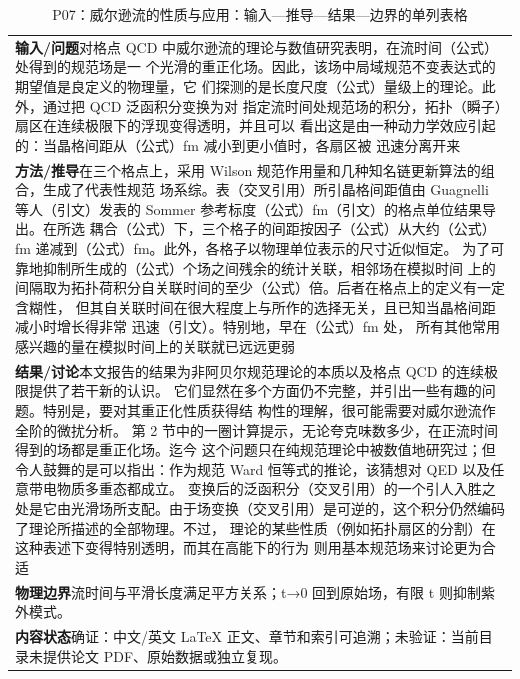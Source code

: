 \documentclass[UTF8,11pt,oneside]{ctexbook}
\begin{document}
\begin{table}[htbp]
  \centering
  \caption*{P07：威尔逊流的性质与应用：输入—推导—结果—边界的单列表格}
  \small
  \begin{tabular}{@{}p{}@{}}
    \toprule
    \textbf{输入/问题}\quad 对格点 QCD 中威尔逊流的理论与数值研究表明，在流时间（公式）处得到的规范场是一 个光滑的重正化场。因此，该场中局域规范不变表达式的期望值是良定义的物理量，它 们探测的是长度尺度（公式）量级上的理论。此外，通过把 QCD 泛函积分变换为对 指定流时间处规范场的积分，拓扑（瞬子）扇区在连续极限下的浮现变得透明，并且可以 看出这是由一种动力学效应引起的：当晶格间距从（公式）fm 减小到更小值时，各扇区被 迅速分离开来 \\
    \textbf{方法/推导}\quad 在三个格点上，采用 Wilson 规范作用量和几种知名链更新算法的组合，生成了代表性规范 场系综。表（交叉引用）所引晶格间距值由 Guagnelli 等人（引文）发表的 Sommer 参考标度（公式）fm（引文）的格点单位结果导出。在所选 耦合（公式）下，三个格子的间距按因子（公式）从大约（公式）fm 递减到（公式）fm。此外，各格子以物理单位表示的尺寸近似恒定。 为了可靠地抑制所生成的（公式）个场之间残余的统计关联，相邻场在模拟时间 上的间隔取为拓扑荷积分自关联时间的至少（公式）倍。后者在格点上的定义有一定含糊性， 但其自关联时间在很大程度上与所作的选择无关，且已知当晶格间距减小时增长得非常 迅速（引文）。特别地，早在（公式）fm 处， 所有其他常用感兴趣的量在模拟时间上的关联就已远远更弱 \\
    \textbf{结果/讨论}\quad 本文报告的结果为非阿贝尔规范理论的本质以及格点 QCD 的连续极限提供了若干新的认识。 它们显然在多个方面仍不完整，并引出一些有趣的问题。特别是，要对其重正化性质获得结 构性的理解，很可能需要对威尔逊流作全阶的微扰分析。 第 2 节中的一圈计算提示，无论夸克味数多少，在正流时间得到的场都是重正化场。迄今 这个问题只在纯规范理论中被数值地研究过；但令人鼓舞的是可以指出：作为规范 Ward 恒等式的推论，该猜想对 QED 以及任意带电物质多重态都成立。 变换后的泛函积分（交叉引用）的一个引人入胜之处是它由光滑场所支配。由于场变换（交叉引用）是可逆的，这个积分仍然编码了理论所描述的全部物理。不过， 理论的某些性质（例如拓扑扇区的分割）在这种表述下变得特别透明，而其在高能下的行为 则用基本规范场来讨论更为合适 \\
    \textbf{物理边界}\quad 流时间与平滑长度满足平方关系；t→0 回到原始场，有限 t 则抑制紫外模式。 \\
    \textbf{内容状态}\quad 确证：中文/英文 LaTeX 正文、章节和索引可追溯；未验证：当前目录未提供论文 PDF、原始数据或独立复现。 \\
    \bottomrule
  \end{tabular}
\end{table}
\end{document}
